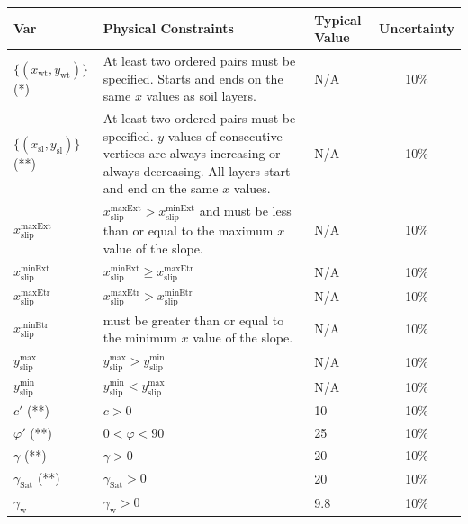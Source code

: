 \documentclass[12pt]{article}
\renewcommand{\arraystretch}{1}
\begin{document}
\begin{table}[!h]
\caption{Input Variables} 
\renewcommand{\arraystretch}{1.5}
\noindent \begin{longtable*}{p{3.1cm} p{5.1cm} p{1.2cm} c}
  \toprule  \label{TblInputVar}
  \textbf{Var} & \textbf{Physical Constraints} & \textbf{Typical
    Value} & \textbf{Uncertainty}\\ \midrule
  $\{(x_{\text{wt}},y_{\text{wt}})\}$ (*) & At least two ordered pairs must be 
  specified. 
  Starts and ends on the same $x$ values as soil layers.  
  & N/A & 10\% \\
  $\{(x_{\text{sl}},y_{\text{sl}})\}$ (**) & At least two ordered pairs must be 
  specified. 
  $y$ values of consecutive vertices are always increasing or always 
  decreasing. All layers start and end on the same $x$ values. & N/A & 10\% \\
  ${x_{\text{slip}}^{\text{maxExt}}}$ & ${x_{\text{slip}}^{\text{maxExt}}} > 
  {x_{\text{slip}}^{\text{minExt}}}$ and must 
  be less than or equal to the maximum $x$ value of the slope. & N/A & 10\% \\
  ${x_{\text{slip}}^{\text{minExt}}}$ & ${x_{\text{slip}}^{\text{minExt}}} \geq 
  {x_{\text{slip}}^{\text{maxEtr}}}$ & 
  N/A & 
  10\% \\
  ${x_{\text{slip}}^{\text{maxEtr}}}$ & ${x_{\text{slip}}^{\text{maxEtr}}} > 
  {x_{\text{slip}}^{\text{minEtr}}}$ & 
  N/A & 10\% \\
  ${x_{\text{slip}}^{\text{minEtr}}}$ & must be greater than or equal to the 
  minimum 
  $x$ 
  value of the 
  slope. & N/A & 10\% \\
  ${y_{\text{slip}}^{\text{max}}}$ & ${y_{\text{slip}}^{\text{max}}} > 
  {y_{\text{slip}}^{\text{min}}}$ & N/A & 10\% \\
  ${y_{\text{slip}}^{\text{min}}}$ & ${y_{\text{slip}}^{\text{min}}} < 
  {y_{\text{slip}}^{\text{max}}}$ & N/A & 10\% \\
  $c'$ (**) & $c >0$ & 10 & 10\%\\
  $\varphi'$ (**) & $ 0 < \varphi < 90 $ & 25 & 10\% \\
  $\gamma$ (**) & $\gamma > 0$ & 20 & 10\% \\
  $\gamma_{\text{Sat}}$ (**) & $\gamma_{\text{Sat}} > 0 $ & 20 & 10\% \\
  $\gamma_{\text{w}}$ & $\gamma_{\text{w}} > 0 $ & 9.8 & 10\% \\
  \bottomrule
\end{longtable*}
\end{table}
\end{document}
